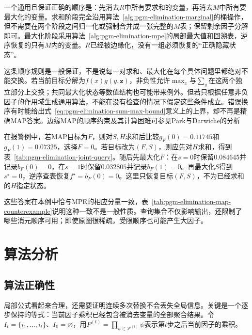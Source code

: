 一个通用且保证正确的顺序是：先消去$R$中所有要求和的变量，再消去$M$中所有要最大化的变量。求和阶段完全沿用算法~\ref{alg:pgm-elimination-marginal}的桶操作，但不需要在两个阶段之间归一化或强制合并成一张完整的$M$表；保留剩余因子分解即可。最大化阶段采用算法~\ref{alg:pgm-elimination-mpe}的局部最大值和回溯表，逆序恢复的只有$M$内的变量。$R$已经被边缘化，没有一组必须恢复的“正确隐藏状态”。

这条顺序规则是一般保证，不是说每一对求和、最大化在每个具体问题里都绝对不能交换。若当前目标分解为$f(x)g(y,\bm{z})$，非负性允许$\max_x$与$\sum_y$在这两个独立部分上交换；共同最大化状态等数值结构也可能带来例外。但若只根据任意非负因子的作用域生成通用算法，不能在没有检查的情况下假定这些条件成立。错误换序有时能给出式~\eqref{eq:pgm-elimination-sum-max-bound}意义上的上界，却不再是精确MAP答案。边缘MAP的顺序约束及其计算困难可参见Park与Darwiche的分析

在报警例中，若MAP目标为$F$，则对$S,H$求和后比较$g_F(0)=0.11745$和$g_F(1)=0.07325$，选择$F=0$。若目标改为$(F,S)$，则应先对$H$求和，得到表~\ref{tab:pgm-elimination-joint-query}。随后先最大化$F$：在$s=0$时保留$0.084645$并记录$b_F(0)=0$，在$s=1$时保留$0.032805$并记录$b_F(1)=0$。再最大化$S$得到$s^\star=0$，逆序查表恢复$f^\star=b_F(0)=0$。这里只恢复目标$(F,S)$，不为已经求和的$H$指定状态。

这些答案在本例中恰与MPE的相应分量一致，表~\ref{tab:pgm-elimination-map-counterexample}说明这种一致不是一般性质。查询集合不仅影响输出，还限制了哪些消元顺序可用；即使原图很稀疏，受限顺序也可能产生大因子。

\section{算法分析}
\label{sec:pgm-elimination-analysis}

\subsection{算法正确性}
\label{sec:pgm-elimination-correctness}

局部公式看起来合理，还需要证明连续多次替换不会丢失全局信息。关键是一个逐步保持的等式：当前因子乘积已经包含被消去变量的全部聚合结果。令$I_t=\{i_1,\ldots,i_t\}$、$I_0=\varnothing$，用$P^{(t)}=\prod_{\psi\in\mathcal{F}^{(t)}}\psi$表示第$t$步之后当前因子的乘积。

